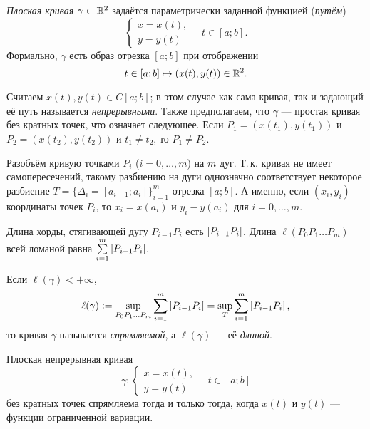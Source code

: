 \begin{definition}
    \textit{Плоская кривая} $\gamma \subset \mathbb{R}^2$ задаётся параметрически заданной функцией (\textit{путём})
    \[
        \begin{cases}
            x = x(t),\\
            y = y(t)
        \end{cases}\quad t \in [a; b].
    \]
    Формально, $\gamma$ есть образ отрезка $[a; b]$ при отображении
    \[
        t \in [a; b] \mapsto (x(t), y(t)) \in \mathbb{R}^2.
    \]
\end{definition}

\begin{remark}
    Считаем $x(t), y(t) \in C[a; b]$; в этом случае как сама кривая, так и задающий её путь называется \textit{непрерывными}. Также предполагаем, что $\gamma$ --- простая кривая без кратных точек, что означает следующее. Если $P_1 = (x(t_1), y(t_1))$ и $P_2 = (x(t_2), y(t_2))$ и $t_1 \ne t_2$, то $P_1 \ne P_2$.
\end{remark}

Разобъём кривую точками $P_i$ ($i = 0, \ldots, m$) на $m$ дуг. Т.\,к. кривая не имеет самопересечений, такому разбиению на дуги однозначно соответствует некоторое разбиение $T = \{\Delta_i = [a_{i - 1}; a_i]\}_{i = 1}^m$ отрезка $[a; b]$. А именно, если $(x_i, y_i)$ --- координаты точек $P_i$, то $x_i = x(a_i)$ и $y_i - y(a_i)$ для $i = 0, \ldots, m$.

Длина хорды, стягивающей дугу $P_{i - 1}P_i$ есть $\left\lvert P_{i - 1}P_i\right\rvert$. Длина $\ell(P_0P_1\ldots P_m)$ всей ломаной равна $\sum\limits_{i = 1}^m\left\lvert P_{i - 1}P_i\right\rvert$.

\begin{definition}
    Если $\ell(\gamma) < +\infty$,
    \[
        \ell(\gamma) \vcentcolon = \sup_{P_0P_1\ldots P_m}\sum_{i = 1}^m\left\lvert P_{i - 1}P_i\right\rvert = \sup_T\sum_{i = 1}^m\left\lvert P_{i - 1}P_i\right\rvert,
    \]
    то кривая $\gamma$ называется \textit{спрямляемой}, а $\ell(\gamma)$ --- её \textit{длиной}.
\end{definition}

\begin{theorem}
    Плоская непрерывная кривая
    \[
        \gamma:
        \begin{cases}
            x = x(t),\\
            y = y(t)
        \end{cases}\quad t \in [a; b]
    \]
    без кратных точек спрямляема тогда и только тогда, когда $x(t)$ и $y(t)$ --- функции ограниченной вариации.
\end{theorem}

